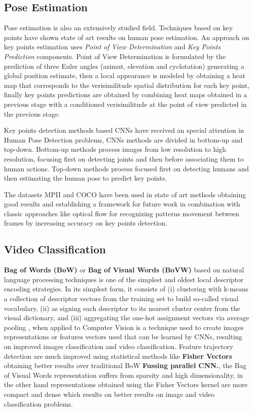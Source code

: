 \documentclass[twocolumn,conference]{article}
\begin{document}
\subsection{Pose Estimation}
Pose estimation is also an extensively studied field. Techniques based on key points have shown state of art results on human pose estimation. An approach on key points estimation \cite{tulsianiMalik} uses \textit{Point of View Determination} and \textit{Key Points Prediction} components. Point of View Determination is formulated by the prediction of three Euler angles (azimut, elevation and cyclotation) generating a global position estimate, then a local appearance is modeled by obtaining a heat map that corresponds to the verisimilitude spatial distribution for each key point, finally key points predictions are obtained by combining heat maps obtained in a previous stage with a conditioned verisimilitude at the point of view predicted in the previous stage.

Key points detection methods based CNNs have received an special attention in Human Pose Detection problems, CNNs methods are divided in bottom-up and top-down. Bottom-up methods process images from low resolution  to high resolution, focusing first on detecting joints and then before associating them to human actions. Top-down methods process focused first on detecting humans and then estimating the human pose to predict key points. 

The datasets MPII and COCO have been used in state of art methods obtaining good results\cite{XiaoWuWeiSimpleBaseline} and establishing a framework for future work in combination with classic approaches like optical flow for recognizing patterns movement between frames by increasing accuracy on key points detection.
\subsection{Video Classification}
\textbf{Bag of Words (BoW)} or \textbf{Bag of Visual Words (BoVW)} based on natural language processing techniques is one of the simplest and oldest local descriptor encoding strategies. In its simplest form, it consists of (i) clustering with k-means a collection of descriptor vectors from the training set to build so-called visual vocabulary, (ii) as signing each descriptor to its nearest cluster center from the visual dictionary, and (iii) aggregating the one-hot assignment vectors via average pooling \cite{wang2019hallucinating}, when applied to Computer Vision is a technique used to create images representations or features vectors used that can be learned by CNNs, resulting on improved images classification and video classification. 
Feature trajectory detection are much improved using statistical methods like \textbf{Fisher Vectors} obtaining better results over traditional BoW \textbf{Fussing parallel CNN.}, the Bag of Visual Words representation suffers from sparsity and high dimensionality, in the other hand representations obtained using the Fisher Vectors kernel are more compact and dense which results on better results on image and video classification problems.
\end{document}
